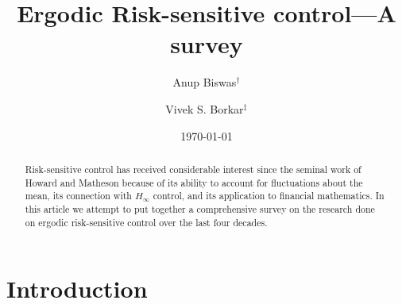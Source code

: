 \documentclass[notitlepage,11pt,reqno]{amsart}
\numberwithin{equation}{section}
\theoremstyle{plain}
\theoremstyle{definition}
\theoremstyle{remark}
\begin{document}
\title[A survey on ergodic risk-sensitive control]%
 {Ergodic Risk-sensitive control---A survey}

\author[Anup Biswas]{Anup Biswas$^\dag$}
\address{$^\dag$ Department of Mathematics\\
Indian Institute of Science Education and Research Pune\\
Dr.\ Homi Bhabha Road\\
Pune 411008, India}

\author[Vivek S. Borkar]{Vivek S. Borkar$^\ddag$}
\address{Department of Electrical Engineering,
Indian Institute of Technology,
Powai, Mumbai 400076, India}


\date{\today}

\begin{abstract}
Risk-sensitive control has received considerable interest since the seminal 
work of Howard and Matheson \cite{Howard-71}  because of its ability to account for fluctuations about the mean, its connection with $H_\infty$ control, and its application to financial mathematics. In this article we attempt to put together
a comprehensive survey on the research  done on ergodic risk-sensitive 
control over the last four decades.
\end{abstract}


\maketitle
\tableofcontents

\section{Introduction}
\end{document}
